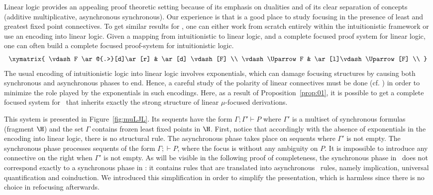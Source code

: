 Linear logic provides an appealing proof theoretic setting because of
its emphasis on dualities and of its clear separation of concepts
(additive \vs{}multiplicative, asynchronous \vs{}synchronous).  Our experience
is that \mumall{} is a good place to study focusing in the presence of
least and greatest fixed point connectives.  To get similar results for
\muLJ, one can either work from scratch entirely
within the intuitionistic framework or use an encoding into linear logic.
Given a mapping from intuitionistic to linear logic, and a complete focused
proof system for linear logic, one can often build a complete
focused proof-system for intuitionistic logic.
\[
\xymatrix
{
 \vdash F \ar@{.>}[d]\ar[r] & \ar[d] \vdash [F] \\
 \vdash \Uparrow F  & \ar[l]\vdash \Uparrow [F] \\
}
\]
The usual encoding of intuitionistic logic into linear logic involves
exponentials, which can damage focusing structures by causing both
synchronous and asynchronous phases to end.
Hence, a careful study of the polarity of linear connectives must
be done (cf. \cite{danos93kgc,liang07csl}) in order to minimize the
role played by the exponentials in such encodings. Here, as a result of
Proposition~\ref{prop:01}, it is possible to get a complete focused
system for \muLJL\ that inherits exactly the strong structure of linear
$\mu$-focused derivations.

This system is presented in Figure~\ref{fig:muLJL}.
Its sequents have the form $\Gamma;\Gamma'\vdash P$ where
$\Gamma'$ is a multiset of synchronous formulas (fragment $\H$)
and the set $\Gamma$ contains frozen least fixed points
in $\H$.
First, notice that accordingly with the absence of exponentials
in the encoding into linear logic, there is no structural rule.
The asynchronous phase takes place on sequents where $\Gamma'$ is not empty.
The synchronous phase processes sequents of the form
$\Gamma ; \vdash P$, where the focus is without any ambiguity on $P$.
It is impossible to introduce any connective on the right when 
$\Gamma'$ is not empty.
As will be visible in the following proof of completeness,
the synchronous phase in \muLJL\ does not correspond exactly to
a synchronous phase in \mumall: it contains rules that are translated
into asynchronous \mumall\ rules, namely implication, universal
quantification and coinduction.
We introduced this simplification in order to simplify the presentation,
which is harmless since there is no choice in refocusing afterwards.

